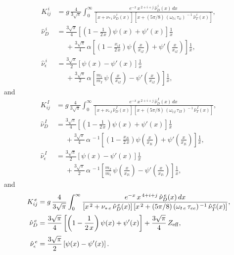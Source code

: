 \documentclass[notitlepage,12pt]{article}
\begin{document}
\begin{align}
K_{ij}^{\,i} &= g\,\frac{4}{3\sqrt{\pi}}\int_0^\infty
\frac{e^{-x}\,x^{\,2+i+j}\,\hat{\nu}_D^{\,i}(x)\,dx}{[x+\nu_{\ast\,i}\,\hat{\nu}_D^{\,i}(x)]\,[x+(5\pi/8)\,(\omega_{t\,i}\,\tau_{ii})^{\,-1}\,\hat{\nu}_T^{\,i}(x)]},\\[0.5ex]
\hat{\nu}_D^{\,i}&= \frac{3\sqrt{\pi}}{4}\left[\left(1-\frac{1}{2\,x}\right)\psi(x)+\psi'(x)\right]\frac{1}{x}\nonumber\\[0.5ex]&\phantom{=}
+\frac{3\sqrt{\pi}}{4}\,\alpha\left[\left(1-\frac{x_{iI}}{2\,x}\right)\psi\!\left(\frac{x}{x_{iI}}\right)
+\psi'\!\left(\frac{x}{x_{iI}}\right)\right]\frac{1}{x},\\[0.5ex]
\hat{\nu}_\epsilon^{\,i}&= \frac{3\sqrt{\pi}}{2}\left[\psi(x)-\psi'(x)\right]\frac{1}{x}\nonumber\\[0.5ex]&\phantom{=}
+\frac{3\sqrt{\pi}}{2}\,\alpha\left[\frac{m_i}{m_I}\,\psi\!\left(\frac{x}{x_{iI}}\right)
-\psi'\!\left(\frac{x}{x_{iI}}\right)\right]\frac{1}{x},
\end{align}
and
\begin{align}
K_{ij}^{\,I}& = g\,\frac{4}{3\sqrt{\pi}}\int_0^\infty
\frac{e^{-x}\,x^{\,2+i+j}\,\hat{\nu}_D^{\,I}(x)\,dx}{[x+\nu_{\ast\,I}\,\hat{\nu}_D^{\,I}(x)]\,[x+(5\pi/8)\,(\omega_{t\,I}\,\tau_{II})^{\,-1}\,\hat{\nu}_T^{\,I}(x)]},\\[0.5ex]
\hat{\nu}_D^{\,I}&= \frac{3\sqrt{\pi}}{4}\left[\left(1-\frac{1}{2\,x}\right)\psi(x)+\psi'(x)\right]\frac{1}{x}\nonumber\\[0.5ex]&\phantom{=}
+\frac{3\sqrt{\pi}}{4}\,\alpha^{\,-1}\left[\left(1-\frac{x_{Ii}}{2\,x}\right)\psi\!\left(\frac{x}{x_{Ii}}\right)
+\psi'\!\left(\frac{x}{x_{Ii}}\right)\right]\frac{1}{x},\\[0.5ex]
\hat{\nu}_\epsilon^{\,I}&= \frac{3\sqrt{\pi}}{2}\left[\psi(x)-\psi'(x)\right]\frac{1}{x}\nonumber\\[0.5ex]&\phantom{=}
+\frac{3\sqrt{\pi}}{2}\,\alpha^{\,-1}\left[\frac{m_I}{m_i}\,\psi\!\left(\frac{x}{x_{Ii}}\right)
-\psi'\!\left(\frac{x}{x_{Ii}}\right)\right]\frac{1}{x},
\end{align}
and
\begin{align}
K_{ij}^{\,e}& = g\,\frac{4}{3\sqrt{\pi}}\int_0^\infty
\frac{e^{-x}\,x^{\,4+i+j}\,\hat{\nu}_D^{\,e}(x)\,dx}{[x^{\,2}+\nu_{\ast\,e}\,\hat{\nu}_D^{\,e}(x)]\,[x^{\,2}+(5\pi/8)\,(\omega_{t\,e}\,\tau_{ee})^{\,-1}\,\hat{\nu}_T^{\,e}(x)]},\\[0.5ex]
\hat{\nu}_D^{\,e}&= \frac{3\sqrt{\pi}}{4}\left[\left(1-\frac{1}{2\,x}\right)\psi(x)+\psi'(x)\right]+\frac{3\sqrt{\pi}}{4}\,Z_{\rm eff},\\[0.5ex]
\hat{\nu}_\epsilon^{\,e}&= \frac{3\sqrt{\pi}}{2}\left[\psi(x)-\psi'(x)\right].
\end{align}
\end{document}
